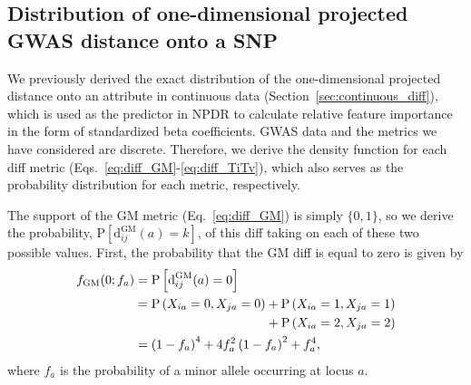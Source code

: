 \documentclass[aoas]{imsart}
\begin{document}
\begin{table}[H]
\begin{adjustbox}{center}
	\end{adjustbox}
\end{table}

\subsection{Distribution of one-dimensional projected GWAS distance onto a SNP}\label{sec:GWAS_diff}

We previously derived the exact distribution of the one-dimensional projected distance onto an attribute in continuous data (Section~\ref{sec:continuous_diff}), which is used as the predictor in NPDR to calculate relative feature importance in the form of standardized beta coefficients. GWAS data and the metrics we have considered are discrete. Therefore, we derive the density function for each diff metric (Eqs.~\ref{eq:diff_GM}-\ref{eq:diff_TiTv}), which also serves as the probability distribution for each metric, respectively.

The support of the GM metric (Eq.~\ref{eq:diff_GM}) is simply $\{0,1\}$, so we derive the probability, $\text{P}\left[\text{d}^\text{GM}_{ij}(a) = k\right]$, of this diff taking on each of these two possible values. First, the probability that the GM diff is equal to zero is given by
%
\begin{equation}\label{eq:probGM0}
\begin{aligned}
f_\text{GM}(0;f_a) &= \text{P}\left[\text{d}^\text{GM}_{ij}(a) = 0\right] \\
&= \text{P}\left(X_{ia}=0,X_{ja}=0\right) + \text{P}\left(X_{ia}=1,X_{ja}=1\right) \\
& \hspace{3.64cm} + \text{P}\left(X_{ia}=2,X_{ja}=2\right) \\
&= \left(1 - f_a\right)^4 + 4 f^2_a \left(1 - f_a\right)^2 + f^4_a,
\end{aligned}
\end{equation}
%
where $f_a$ is the probability of a minor allele occurring at locus $a$.
\end{document}
